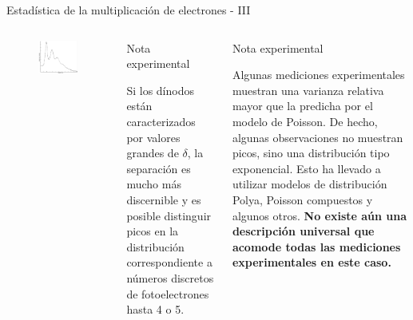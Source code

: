 \documentclass[a4paper,10pt]{beamer}
\begin{document}
\begin{frame}{Estadística de la multiplicación de electrones - III}

 \begin{columns}[c]
 
\column{2in}

\begin{figure}
 \includegraphics[scale=0.2]{fig13}
\end{figure}

\begin{exampleblock}{Nota experimental}
\begin{justify}
\begin{footnotesize}
Si los dínodos están caracterizados por valores grandes de $\delta$, la separación 
es mucho más discernible y es posible distinguir picos en la distribución correspondiente 
a números discretos de fotoelectrones hasta 4 o 5.
\end{footnotesize}
\end{justify}
\end{exampleblock}

\column{2in}

\begin{exampleblock}{Nota experimental}
\begin{justify}
\begin{footnotesize}
Algunas mediciones experimentales muestran una varianza relativa mayor que la predicha 
por el modelo de Poisson. De hecho, algunas observaciones no muestran picos, sino 
una distribución tipo exponencial. Esto ha llevado a utilizar modelos de distribución
Polya, Poisson compuestos y algunos otros. \textbf{No existe aún una descripción universal
que acomode todas las mediciones experimentales en este caso.}
\end{footnotesize}
\end{justify}
\end{exampleblock}

\end{columns}

\end{frame}
\end{document}
